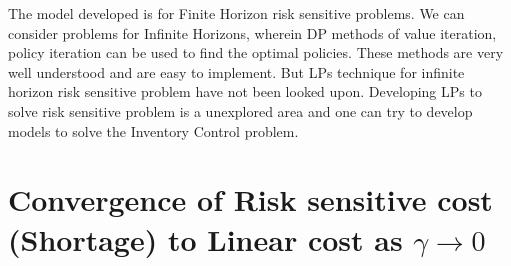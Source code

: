 \documentclass[11pt,a4paper,oneside]{report}
\begin{document}
The model developed is for Finite Horizon risk sensitive problems. We can consider problems for Infinite Horizons, wherein DP methods of value iteration, policy iteration can be used to find the optimal policies. These methods are very well understood and are easy to implement. But LPs technique for infinite horizon risk sensitive problem have not been looked upon. Developing LPs to solve risk sensitive problem is a unexplored area and one can try to develop models to solve the Inventory Control problem.
\nocite{*}


\appendix
\chapter{Convergence of Risk sensitive cost (Shortage) to Linear cost as $\gamma\rightarrow 0$}

\end{document}
